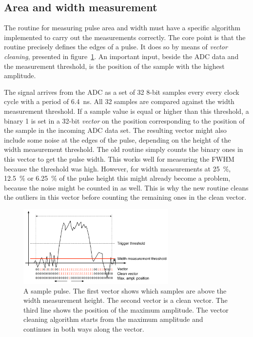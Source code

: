 \subsection{Area and width measurement}
\label{sec:vecclean}
The routine for measuring pulse area and width must have a specific algorithm implemented to carry out the measurements correctly. The core point is that the routine precisely defines the edges of a pulse. It does so by means of \emph{vector cleaning}, presented in figure~\ref{fig:samplepulse}. An important input, beside the ADC data and the measurement threshold, is the position of the sample with the highest amplitude. 

The signal arrives from the ADC as a set of 32 8-bit samples every every clock cycle with a period of 6.4~ns. All 32 samples are compared against the width measurement threshold. If a sample value is equal or higher than this threshold, a binary 1 is set in a 32-bit \emph{vector} on the position corresponding to the position of the sample in the incoming ADC data set. The resulting vector might also include some noise at the edges of the pulse, depending on the height of the width measurement threshold. The old routine simply counts the binary ones in this vector to get the pulse width. This works well for measuring the FWHM because the threshold was high. However, for width measurements at 25~\%, 12.5~\% or 6.25~\% of the pulse height this might already become a problem, because the noise might be counted in as well. This is why the new routine cleans the outliers in this vector before counting the remaining ones in the clean vector. 

\begin{figure}[!t]
\centering
\includegraphics[width=0.7\textwidth]{05_current_monitoring/plots/pulse1}
\caption{A sample pulse. The first vector shows which samples are above the width measurement height. The second vector is a clean vector. The third line shows the position of the maximum amplitude. The vector cleaning algorithm starts from the maximum amplitude and continues in both ways along the vector.}
\label{fig:samplepulse}
\end{figure}

